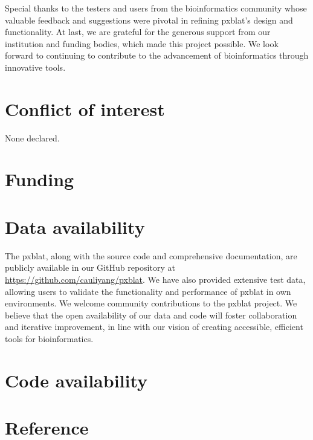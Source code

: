 Special thanks to the testers and users from the bioinformatics community whose valuable feedback and suggestions were pivotal in refining \gls{pxblat}'s design and functionality.
At last, we are grateful for the generous support from our institution and funding bodies, which made this project possible.
We look forward to continuing to contribute to the advancement of bioinformatics through innovative tools.

\section*{Conflict of interest}\label{sec:conflict-of-interest}

None declared.

\section*{Funding}\label{sec:funding}


\section*{Data availability}\label{sec:data-availability}

The \gls{pxblat}, along with the source code and comprehensive documentation, are publicly available in our GitHub repository at \url{https://github.com/cauliyang/pxblat}.
We have also provided extensive test data, allowing users to validate the functionality and performance of \gls{pxblat} in own environments.
We welcome community contributions to the \gls{pxblat} project.
We believe that the open availability of our data and code will foster collaboration and iterative improvement, in line with our vision of creating accessible, efficient tools for bioinformatics.

\section*{Code availability}\label{sec:code-availability}

\section*{Reference}\label{sec:reference}



